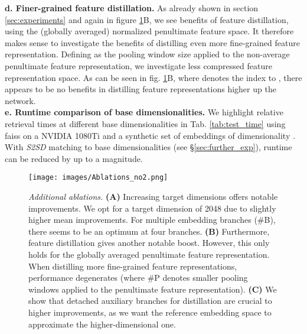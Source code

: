 \documentclass{article} \usepackage{arxiv_style,times}
\begin{document}
\textbf{d. Finer-grained feature distillation.} As already shown in section \ref{sec:experiments} and again in figure \ref{fig:ablations_2}B, we see benefits of feature distillation, using the (globally averaged) normalized penultimate feature space. It therefore makes sense to investigate the benefits of distilling even more fine-grained feature representation. Defining  as the pooling window size applied to the non-average penultimate feature representation, we investigate less compressed feature representation space. As can be seen in fig. \ref{fig:ablations_2}B, where  denotes the index to , there appears to be no benefits in distilling feature representations higher up the network.\\ 
\textbf{e. Runtime comparison of base dimensionalities.} We highlight relative retrieval times at different base dimensionalities in Tab. \ref{tab:test_time} using \textsf{faiss} \citep{faiss} on a NVIDIA 1080Ti and a synthetic set of  embeddings of dimensionality . With \textit{S2SD} matching  to base dimensionalities  (see \S\ref{sec:further_exp}), runtime can be reduced by up to a magnitude.

\begin{figure}[t]
\centering
\texttt{[image: images/Ablations\_no2.png]}
\caption{\small{\textit{Additional ablations.} \textbf{(A)} Increasing target dimensions offers notable improvements. We opt for a target dimension of 2048 due to slightly higher mean improvements. For multiple embedding branches (\#B), there seems to be an optimum at four branches. \textbf{(B)} Furthermore, feature distillation gives another notable boost. However, this only holds for the globally averaged penultimate feature representation. When distilling more fine-grained feature representations, performance degenerates (where \#P denotes smaller pooling windows applied to the penultimate feature representation). \textbf{(C)} We show that detached auxiliary branches for distillation are crucial to higher improvements, as we want the reference embedding space to approximate the higher-dimensional one.}}
\label{fig:ablations_2}
\end{figure}



 
\begin{table}[h!]
    \centering
    \caption{\small{Sample retrieval times for 250000 embeddings with varying base dimensionalities.}}
    \label{tab:test_time}
\end{table}
\end{document}
